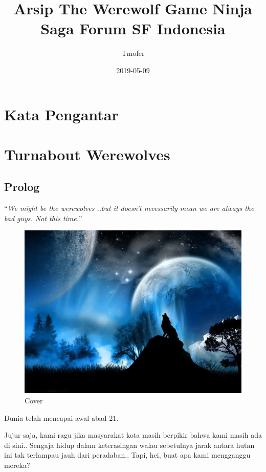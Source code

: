 \documentclass[]{book}
\title{Arsip The Werewolf Game Ninja Saga Forum SF Indonesia}
\author{Tmofer}
\date{2019-05-09}
\begin{document}
\maketitle

{
\setcounter{tocdepth}{1}
\tableofcontents
}
\chapter*{Kata Pengantar}\label{kata-pengantar}

\chapter{Turnabout Werewolves}\label{turnabout-werewolves}

\section{Prolog}\label{prolog}

``\emph{We might be the werewolves ..but it doesn't necessarily mean we
are always the bad guys. Not this time.}''

\begin{figure}
\centering
\includegraphics{Gambar/01-cover}
\caption{Cover}
\end{figure}

Dunia telah mencapai awal abad 21.

Jujur saja, kami ragu jika masyarakat kota masih berpikir bahwa kami
masih ada di sini.. Sengaja hidup dalam keterasingan walau sebetulnya
jarak antara hutan ini tak terlampau jauh dari peradaban.. Tapi, hei,
buat apa kami mengganggu mereka?
\end{document}
